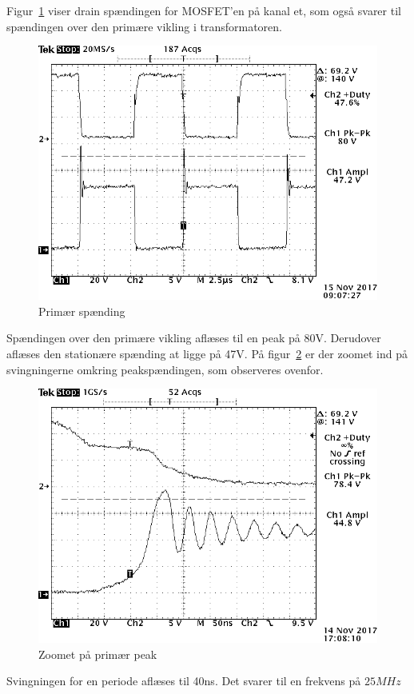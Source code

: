 Figur~\ref{fig: privolt} viser drain spændingen for MOSFET'en på kanal et, som også svarer til spændingen over den primære vikling i transformatoren.
\begin{figure}[H]
	\center
	\includegraphics[max width=0.7\linewidth]{../dokumentation/tex/2iteration/billeder/Realisering/Transformator_Primar.png}
	\caption{Primær spænding}
	\label{fig: privolt}
\end{figure}
Spændingen over den primære vikling aflæses til en peak på 80V. Derudover aflæses den stationære spænding at ligge på 47V. 
På figur~\ref{fig: prizoom} er der zoomet ind på svingningerne omkring peakspændingen, som observeres ovenfor.
\begin{figure}[H]
	\center
	\includegraphics[max width=0.7\linewidth]{../dokumentation/tex/2iteration/billeder/Realisering/Transformator_Primarzoom.png}
	\caption{Zoomet på primær peak}
	\label{fig: prizoom}
\end{figure}
Svingningen for en periode aflæses til 40ns. Det svarer til en frekvens på $25MHz$


